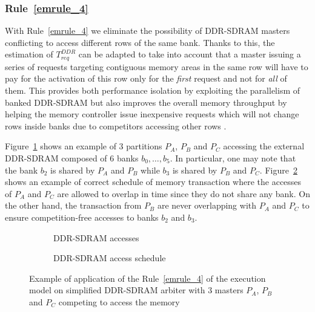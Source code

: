 \documentclass[main.tex]{subfiles}
\begin{document}
\subsubsection{Rule~\ref{emrule_4}}
With Rule~\ref{emrule_4} we eliminate the possibility of DDR-SDRAM masters conflicting to access different rows of the same bank. Thanks to this, the estimation of $T_{req}^{DDR}$ can be adapted to take into account that a master issuing a series of requests targeting contiguous memory areas in the same row will have to pay for the activation of this row only for the \emph{first} request and not for \emph{all} of them. This provides both performance isolation by exploiting the parallelism of banked DDR-SDRAM but also improves the overall memory throughput by helping the memory controller issue inexpensive requests which will not change rows inside banks due to competitors accessing other rows .

\begin{example}
    Figure~\ref{fig_execModel_exampleRule4_ddr} shows an example of 3 partitions $P_A$, $P_B$ and $P_C$ accessing the external DDR-SDRAM composed of 6 banks $b_0 , \ldots , b_5$. In particular, one may note that the bank $b_2$ is shared by $P_A$ and $P_B$ while $b_3$ is shared by $P_B$ and $P_C$. Figure~\ref{fig_execModel_exampleRule4_diagram} shows an example of correct schedule of memory transaction where the accesses of $P_A$ and $P_C$ are allowed to overlap in time since they do not share any bank. On the other hand, the transaction from $P_B$ are never overlapping with $P_A$ and $P_C$ to ensure competition-free accesses to banks $b_2$ and $b_3$.
\end{example}

\begin{figure}
    \centering
    \begin{subfigure}[b]{0.3\linewidth}
    \centering
        \scalebox{0.6}{}
        \caption{DDR-SDRAM accesses}
        \label{fig_execModel_exampleRule4_ddr}
    \end{subfigure}\hspace{6mm}
    \begin{subfigure}[b]{0.65\linewidth}
    \centering
        
        \caption{DDR-SDRAM access schedule}
        \label{fig_execModel_exampleRule4_diagram}
    \end{subfigure}
    \caption{Example of application of the Rule~\ref{emrule_4} of the execution model on simplified DDR-SDRAM arbiter with 3 masters $P_A$, $P_B$ and $P_C$ competing to access the memory}
    \label{fig_execModel_exampleRule4}
\end{figure}
\end{document}
